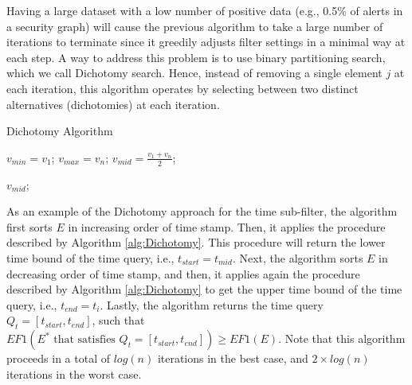  Having a large dataset with a low number of positive data (e.g., 0.5\% of alerts in a security graph) will cause the previous algorithm to take a large number of iterations to terminate since it greedily adjusts filter settings in a minimal way at each step.  A way to address this problem is to use binary partitioning search, which we call Dichotomy search.  Hence, instead of removing a single element $j$ at each iteration, this algorithm operates by selecting between two distinct alternatives (dichotomies) at each iteration. 

\begin{algorithm}[t]
\caption{Dichotomy Algorithm}
\SetAlgoLined
{}
\BlankLine
\label{alg:Dichotomy}

$v_{min}=v_1$; $v_{max}=v_n$;  $v_{mid}=\tfrac{v_1+v_n}{2}$;

\Return  $v_{mid}$;

\label{alg:return}
\end{algorithm} 



As an example of the Dichotomy approach for the time sub-filter, the algorithm first sorts $E$ in increasing order of time stamp. Then, it applies the procedure described by Algorithm \ref{alg:Dichotomy}. This procedure will return  the lower time bound of the time query, i.e., $t_{start}=t_{mid}$.
Next, the algorithm sorts $E$ in decreasing order of time stamp, and then, it applies again the procedure described by Algorithm \ref{alg:Dichotomy} to get the upper time bound of the time query, i.e., $t_{end}=t_i$. Lastly, the algorithm returns the  time query $Q_t=[t_{start},t_{end}]$, such that $EF1(E^{*} \textrm{ that satisfies } Q_t=[t_{start},t_{end}]) \geq EF1(E)$. Note that this algorithm proceeds in a total of $log(n)$ iterations in the best case, and $2\times log(n)$ iterations in the worst case.

